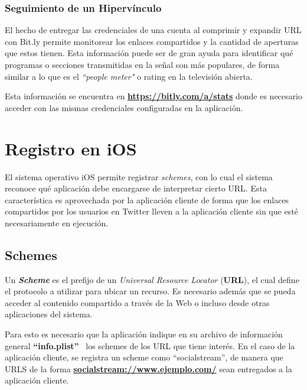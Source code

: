 		\subsubsection{Seguimiento de un Hipervínculo}		
El hecho de entregar las credenciales de una cuenta al comprimir y expandir URL con Bit.ly permite monitorear los enlaces compartidos y la cantidad de aperturas que estos tienen. Esta información puede ser de gran ayuda para identificar qué programas o secciones transmitidas en la señal son más populares, de forma similar a lo que es el \textit{\textquotedblleft people meter"} o rating en la televisión abierta.

Esta información se encuentra en \textbf{\url{https://bitly.com/a/stats}} donde es necesario acceder con las mismas credenciales configuradas en la aplicación.

\clearpage
\section{Registro en iOS}
El sistema operativo iOS permite registrar \textit{schemes}, con lo cual el sistema reconoce qué aplicación debe encargarse de interpretar cierto URL. Esta característica es aprovechada por la aplicación cliente de forma que los enlaces compartidos por los usuarios en Twitter lleven a la aplicación cliente sin que esté necesariamente en ejecución.
	\subsection{Schemes}
	Un \textbf{\textit{Scheme}} es el prefijo de un \textit{Universal Resource Locator} (\textbf{URL}), el cual define el protocolo a utilizar para ubicar un recurso.
	Es necesario además que se pueda acceder al contenido compartido a través de la Web o incluso desde otras aplicaciones del sistema.

Para esto es necesario que la aplicación indique en su archivo de información general \textbf{\textquotedblleft info.plist\textquotedblright}  \ los schemes de los URL que tiene interés.
En el caso de la aplicación cliente, se registra un scheme como \textquotedblleft socialstream\textquotedblright , de manera que URLS de la forma \textbf{\url{socialstream://www.ejemplo.com/}} sean entregados a la aplicación cliente.


